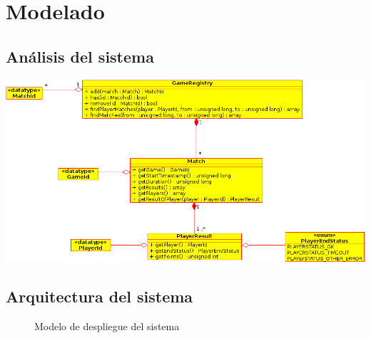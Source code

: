 \chapter{Modelado}

\section{Análisis del sistema}
 \begin{center}
  \includegraphics[scale=0.6]{./class_diagram.png}
 \end{center}


\section{Arquitectura del sistema}
\begin{figure}[center]
 \caption{Modelo de despliegue del sistema}
 \label{fig:arquitectura}
\end{figure}
